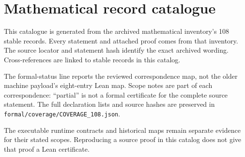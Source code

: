 \clearpage\appendix
\section{Mathematical record catalogue}\label{app:catalog}
This catalogue is generated from the archived mathematical inventory's 108 stable records. Every statement and attached proof comes from that inventory. The source locator and statement hash identify the exact archived wording. Cross-references are linked to stable records in this catalog.

The formal-status line reports the reviewed correspondence map, not the older machine payload's eight-entry Lean map. Scope notes are part of each correspondence: ``partial'' is not a formal certificate for the complete source statement. The full declaration lists and source hashes are preserved in \nolinkurl{formal/coverage/COVERAGE_108.json}.

The executable runtime contracts and historical maps remain separate evidence for their stated scopes. Reproducing a source proof in this catalog does not give that proof a Lean certificate.
